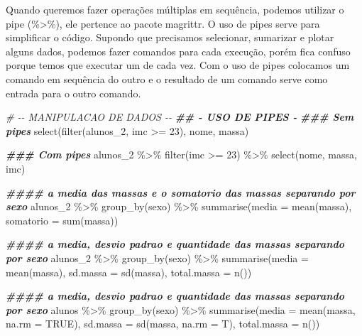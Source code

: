 \documentclass[
]{book}
\newenvironment{Shaded}{\begin{snugshade}}{\end{snugshade}}
\newcommand{\AttributeTok}[1]{\textcolor[rgb]{0.77,0.63,0.00}{#1}}
\newcommand{\CommentTok}[1]{\textcolor[rgb]{0.56,0.35,0.01}{\textit{#1}}}
\newcommand{\ConstantTok}[1]{\textcolor[rgb]{0.00,0.00,0.00}{#1}}
\newcommand{\DecValTok}[1]{\textcolor[rgb]{0.00,0.00,0.81}{#1}}
\newcommand{\DocumentationTok}[1]{\textcolor[rgb]{0.56,0.35,0.01}{\textbf{\textit{#1}}}}
\newcommand{\FunctionTok}[1]{\textcolor[rgb]{0.00,0.00,0.00}{#1}}
\newcommand{\NormalTok}[1]{#1}
\newcommand{\SpecialCharTok}[1]{\textcolor[rgb]{0.00,0.00,0.00}{#1}}
\begin{document}
Quando queremos fazer operações múltiplas em sequência, podemos utilizar o pipe (\%\textgreater\%), ele pertence ao pacote magrittr. O uso de pipes serve para simplificar o código. Supondo que precisamos selecionar, sumarizar e plotar alguns dados, podemos fazer comandos para cada execução, porém fica confuso porque temos que executar um de cada vez. Com o uso de pipes colocamos um comando em sequência do outro e o resultado de um comando serve como entrada para o outro comando.

\begin{Shaded}
\begin{Highlighting}[]
\CommentTok{\# {-}{-} MANIPULACAO DE DADOS {-}{-}}
\DocumentationTok{\#\# {-} USO DE PIPES {-}}
\DocumentationTok{\#\#\# Sem pipes}
\FunctionTok{select}\NormalTok{(}\FunctionTok{filter}\NormalTok{(alunos\_2, imc }\SpecialCharTok{\textgreater{}=} \DecValTok{23}\NormalTok{), nome, massa)}

\DocumentationTok{\#\#\# Com pipes}
\NormalTok{alunos\_2 }\SpecialCharTok{\%\textgreater{}\%}
\FunctionTok{filter}\NormalTok{(imc }\SpecialCharTok{\textgreater{}=} \DecValTok{23}\NormalTok{) }\SpecialCharTok{\%\textgreater{}\%}
\FunctionTok{select}\NormalTok{(nome, massa, imc)}

\DocumentationTok{\#\#\#\# a media das massas e o somatorio das massas separando por sexo}
\NormalTok{alunos\_2 }\SpecialCharTok{\%\textgreater{}\%}
\FunctionTok{group\_by}\NormalTok{(sexo) }\SpecialCharTok{\%\textgreater{}\%}
\FunctionTok{summarise}\NormalTok{(}\AttributeTok{media =} \FunctionTok{mean}\NormalTok{(massa),}
\AttributeTok{somatorio =} \FunctionTok{sum}\NormalTok{(massa))}

\DocumentationTok{\#\#\#\# a media, desvio padrao e quantidade das massas separando por sexo}
\NormalTok{alunos\_2 }\SpecialCharTok{\%\textgreater{}\%}
\FunctionTok{group\_by}\NormalTok{(sexo) }\SpecialCharTok{\%\textgreater{}\%}
\FunctionTok{summarise}\NormalTok{(}\AttributeTok{media =} \FunctionTok{mean}\NormalTok{(massa),}
\AttributeTok{sd.massa =} \FunctionTok{sd}\NormalTok{(massa),}
\AttributeTok{total.massa =} \FunctionTok{n}\NormalTok{())}

\DocumentationTok{\#\#\#\# a media, desvio padrao e quantidade das massas separando por sexo}
\NormalTok{alunos }\SpecialCharTok{\%\textgreater{}\%}
\FunctionTok{group\_by}\NormalTok{(sexo) }\SpecialCharTok{\%\textgreater{}\%}
\FunctionTok{summarise}\NormalTok{(}\AttributeTok{media =} \FunctionTok{mean}\NormalTok{(massa, }\AttributeTok{na.rm =} \ConstantTok{TRUE}\NormalTok{),}
\AttributeTok{sd.massa =} \FunctionTok{sd}\NormalTok{(massa, }\AttributeTok{na.rm =}\NormalTok{ T),}
\AttributeTok{total.massa =} \FunctionTok{n}\NormalTok{())}
\end{Highlighting}
\end{Shaded}
\end{document}
